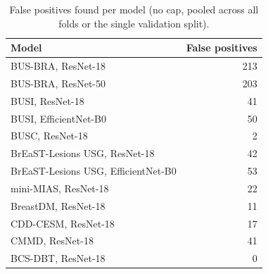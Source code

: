 \documentclass[11pt]{article}
\begin{document}
\begin{table}[htbp]
  \centering
  \caption{False positives found per model (no cap, pooled across all folds or the single validation split).}
  \label{tab:gradcam-fp-counts}
  \begin{tabular}{lr}
    \toprule
    Model & False positives \\
    \midrule
    BUS-BRA, ResNet-18 & 213 \\
    BUS-BRA, ResNet-50 & 203 \\
    BUSI, ResNet-18 & 41 \\
    BUSI, EfficientNet-B0 & 50 \\
    BUSC, ResNet-18 & 2 \\
    BrEaST-Lesions USG, ResNet-18 & 42 \\
    BrEaST-Lesions USG, EfficientNet-B0 & 53 \\
    mini-MIAS, ResNet-18 & 22 \\
    BreastDM, ResNet-18 & 11 \\
    CDD-CESM, ResNet-18 & 17 \\
    CMMD, ResNet-18 & 41 \\
    BCS-DBT, ResNet-18 & 0 \\
    \bottomrule
  \end{tabular}
\end{table}
\end{document}
